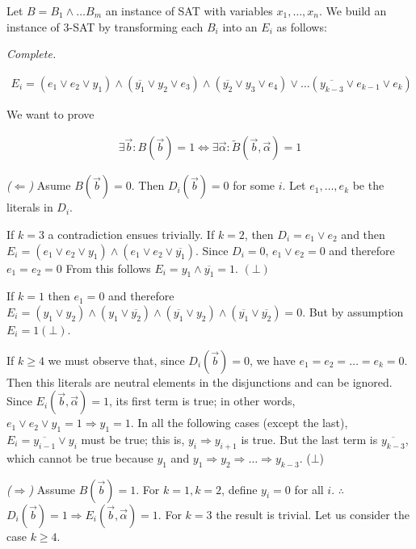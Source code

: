 \documentclass[a4paper]{article}
\begin{document}
Let $B = B_1 \land  \ldots B_m$ an instance of SAT with variables 
$x_1, \ldots, x_n$. We build an instance of $3$-SAT 
by transforming each $B_i$ into an $E_i$ as follows:

\textit{Complete.}

\begin{align*}
E_i = (e_1 \lor  e_2 \lor y_1) \land  (\overline{y_1} \lor  y_2 \lor  e_3) \land  (\overline{y_2} \lor  y_3 \lor  e_4) \lor \ldots (\overline{y_{k-3}} \lor e_{k-1} \lor e_{k})
\end{align*}

We want to prove

\begin{align*}
    \exists \overrightarrow{b} : B(\overrightarrow{b}) = 1 \iff \exists \overrightarrow{\alpha} : \tilde{ B }(\overrightarrow{b}, \overrightarrow{\alpha}) = 1
\end{align*}

\textit{($\Leftarrow$)} Asume $B(\overrightarrow{b}) = 0$. Then
$D_i(\overrightarrow{b}) = 0$ for some $i$. Let 
 $e_1, \ldots, e_k$ be the literals in $D_i$.

If $k = 3$ a contradiction ensues trivially. If $k = 2$, then $D_i = e_1 \lor
e_2$ and then $E_i = (e_1 \lor  e_2 \lor y_1) \land  (e_1 \lor  e_2 \lor
\overline{y_1})$. Since $D_i = 0$, $e_1 \lor  e_2 = 0$ and therefore $e_1 = e_2
= 0$ From this follows  $E_i = y_1 \land \overline{y_1} = 1$. $(\bot)$

If $k = 1$ then $e_1 = 0$ and therefore $E_i = (y_1 \lor  y_2) \land  (y_1 \lor
\overline{y_2}) \land  (\overline{y_1} \lor  y_2) \land  (\overline{y_1} \lor
\overline{y_2}) = 0$. But by assumption $E_i = 1 (\bot)$.

If $k\geq 4$ we must observe that, since $D_i(\overrightarrow{b}) =
0$, we have $e_1 = e_2 = \ldots = e_k = 0$. Then this literals 
are neutral elements in the disjunctions and can be ignored.
Since $E_i(\overrightarrow{b}, \overrightarrow{\alpha}) = 1$, its first term 
is true; in other words, $e_1 \lor  e_2 \lor  y_1 = 1
\Rightarrow y_1 = 1$. In all the following cases (except the last),
$E_i = \overline{y_{i-1}} \lor  y_i$ must be true; this is,
$y_i \Rightarrow y_{i+1}$ is true. But the last term is $\overline{y_{k-3}}$,
which cannot be true because $y_1$ and $ y_1 \Rightarrow y_2 \Rightarrow \ldots
\Rightarrow y_{k-3}$. ($\bot$)

\textit{($\Rightarrow$)} Assume $B(\overrightarrow{b}) = 1$. For $k = 1, k = 2$, define 
$y_i = 0$ for all $i$. $\therefore $ $D_i(\overrightarrow{b}) = 1 \Rightarrow
E_i(\overrightarrow{b}, \overrightarrow{\alpha}) = 1$. For $k = 3$ the result 
is trivial. Let us consider the case $k \geq 4$.
\end{document}
